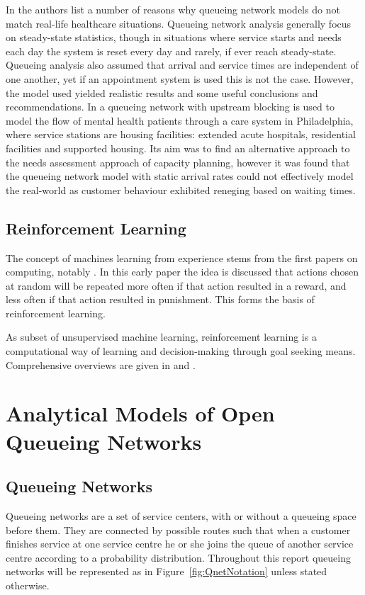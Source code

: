 \documentclass{article}
\begin{document}
In \cite{albinetal90} the authors list a number of reasons why queueing network models do not match real-life healthcare situations.
Queueing network analysis generally focus on steady-state statistics, though in situations where service starts and needs each day the system is reset every day and rarely, if ever reach steady-state.
Queueing analysis also assumed that arrival and service times are independent of one another, yet if an appointment system is used this is not the case.
However, the model used yielded realistic results and some useful conclusions and recommendations.
In \cite{koizumietal05} a queueing network with upstream blocking is used to model the flow of mental health patients through a care system in Philadelphia, where service stations are housing facilities: extended acute hospitals, residential facilities and supported housing.
Its aim was to find an alternative approach to the needs assessment approach of capacity planning, however it was found that the queueing network model with static arrival rates could not effectively model the real-world as customer behaviour exhibited reneging based on waiting times.

\subsection{Reinforcement Learning}
The concept of machines learning from experience stems from the first papers on computing, notably \cite{turing50}.
In this early paper the idea is discussed that actions chosen at random will be repeated more often if that action resulted in a reward, and less often if that action resulted in punishment.
This forms the basis of reinforcement learning.

As subset of unsupervised machine learning, reinforcement learning is a computational way of learning and decision-making through goal seeking means.
Comprehensive overviews are given in \cite{suttonbarto98} and \cite{szepesvari10}.




\section{Analytical Models of Open Queueing Networks}
\subsection {Queueing Networks}
Queueing networks are a set of service centers, with or without a queueing space before them.
They are connected by possible routes such that when a customer finishes service at one service centre he or she joins the queue of another service centre according to a probability distribution.
Throughout this report queueing networks will be represented as in Figure~\ref{fig:QnetNotation} unless stated otherwise.
\end{document}
